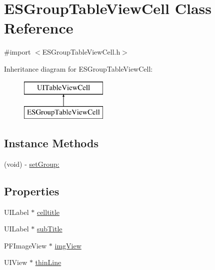 \hypertarget{interface_e_s_group_table_view_cell}{}\section{E\+S\+Group\+Table\+View\+Cell Class Reference}
\label{interface_e_s_group_table_view_cell}


{\ttfamily \#import $<$E\+S\+Group\+Table\+View\+Cell.\+h$>$}

Inheritance diagram for E\+S\+Group\+Table\+View\+Cell\+:\begin{figure}[H]
\begin{center}
\leavevmode
\includegraphics[height=2.000000cm]{interface_e_s_group_table_view_cell}
\end{center}
\end{figure}
\subsection*{Instance Methods}
\begin{DoxyCompactItemize}
\item 
(void) -\/ \hyperlink{interface_e_s_group_table_view_cell_a91b17c34c4b8f7623321ec0e04e5047d}{set\+Group\+:}
\end{DoxyCompactItemize}
\subsection*{Properties}
\begin{DoxyCompactItemize}
\item 
U\+I\+Label $\ast$ \hyperlink{interface_e_s_group_table_view_cell_a1be2a07d84bf06187855ed8da2d191ce}{celltitle}
\item 
U\+I\+Label $\ast$ \hyperlink{interface_e_s_group_table_view_cell_a7fe06c706fd1e64326f7b4490d116136}{sub\+Title}
\item 
P\+F\+Image\+View $\ast$ \hyperlink{interface_e_s_group_table_view_cell_aced51e22fb1f7b313947cd4c3ae1c799}{img\+View}
\item 
U\+I\+View $\ast$ \hyperlink{interface_e_s_group_table_view_cell_a06490ea329f6226914035b1acb2d039e}{thin\+Line}
\end{DoxyCompactItemize}


